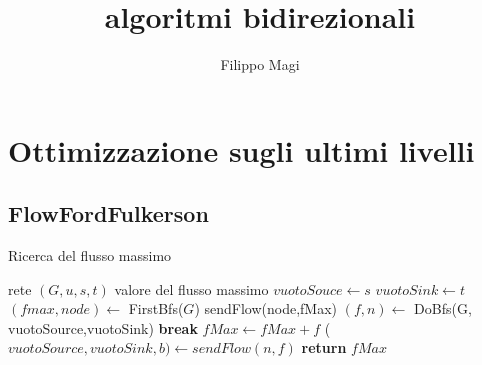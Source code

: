 \documentclass{article}
\title{algoritmi bidirezionali}
\author{Filippo Magi }
\begin{document}
\maketitle
\section{Ottimizzazione sugli ultimi livelli}
\subsection{FlowFordFulkerson}
\begin{algorithm}
    \caption{Ricerca del flusso massimo}
    \begin{algorithmic}[1]
        \REQUIRE rete $(G,u,s,t)$
        \ENSURE valore del flusso massimo
        \STATE $vuotoSouce \leftarrow s $
        \STATE $vuotoSink \leftarrow t$
        \STATE $(fmax,node) \leftarrow$ FirstBfs($G$)
        \STATE sendFlow(node,fMax)
        \STATE $(f,n) \leftarrow$ DoBfs(G, vuotoSource,vuotoSink)
        \STATE \textbf{break}
        \ENDIF
        \STATE $fMax \leftarrow fMax + f$
        \STATE ($vuotoSource,vuotoSink,b) \leftarrow sendFlow(n,f)$
            \ENDWHILE
            \STATE \textbf{return} $fMax$
    \end{algorithmic}
\end{algorithm}
\end{document}
